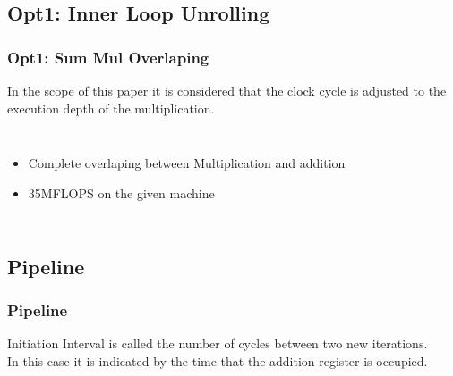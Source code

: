 \documentclass{beamer}
\begin{document}
\begin{frame}
\subsection{Opt1: Inner Loop Unrolling}
\frametitle{Opt1: Sum Mul Overlaping}

In the scope of this paper it is considered that the clock cycle is adjusted to the execution depth of the multiplication.

\begin{columns}[c]



\begin{itemize}
\item Complete overlaping between Multiplication and addition
\item 35MFLOPS on the given machine
\end{itemize}
\end{columns}
\end{frame}
\begin{frame}
\subsection{Pipeline}
\frametitle{Pipeline}
\alert{Initiation Interval} is called the number of cycles between two new iterations.\\
In this case it is indicated by the time that the addition register is occupied.
\end{frame}
\begin{frame}
\subsection{}
\frametitle{}

\end{frame}
\end{document}

